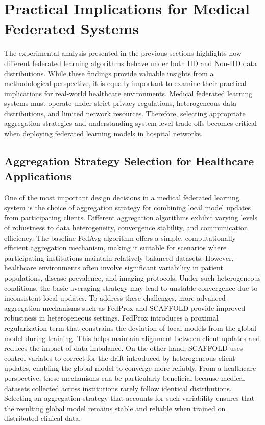 \documentclass[12pt]{book}
\begin{document}
\chapter{Practical Implications for Medical Federated Systems}
The experimental analysis presented in the previous sections highlights how different federated learning algorithms behave under both IID and Non-IID data distributions. While these findings provide valuable insights from a methodological perspective, it is equally important to examine their practical implications for real-world healthcare environments. Medical federated learning systems must operate under strict privacy regulations, heterogeneous data distributions, and limited network resources. Therefore, selecting appropriate aggregation strategies and understanding system-level trade-offs becomes critical when deploying federated learning models in hospital networks.

\section{Aggregation Strategy Selection for Healthcare Applications}
One of the most important design decisions in a medical federated learning system is the choice of aggregation strategy for combining local model updates from participating clients. Different aggregation algorithms exhibit varying levels of robustness to data heterogeneity, convergence stability, and communication efficiency.
The baseline FedAvg algorithm offers a simple, computationally efficient aggregation mechanism, making it suitable for scenarios where participating institutions maintain relatively balanced datasets. However, healthcare environments often involve significant variability in patient populations, disease prevalence, and imaging protocols. Under such heterogeneous conditions, the basic averaging strategy may lead to unstable convergence due to inconsistent local updates.
To address these challenges, more advanced aggregation mechanisms such as FedProx and SCAFFOLD provide improved robustness in heterogeneous settings. FedProx introduces a proximal regularization term that constrains the deviation of local models from the global model during training. This helps maintain alignment between client updates and reduces the impact of data imbalance. On the other hand, SCAFFOLD uses control variates to correct for the drift introduced by heterogeneous client updates, enabling the global model to converge more reliably.
From a healthcare perspective, these mechanisms can be particularly beneficial because medical datasets collected across institutions rarely follow identical distributions. Selecting an aggregation strategy that accounts for such variability ensures that the resulting global model remains stable and reliable when trained on distributed clinical data.
\end{document}
